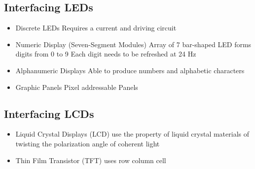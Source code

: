 \subsection{Interfacing LEDs}
\begin{itemize}
	\item Discrete \acs{LED}s
	\subitem Requires a current and driving circuit
	\item Numeric Display (Seven-Segment Modules)
	\subitem Array of 7 bar-shaped \acs{LED} forms digits from 0 to 9
	\subitem Each digit needs to be refreshed at 24 Hz
	\item Alphanumeric Displays
	\subitem Able to produce numbers and alphabetic characters
	\item Graphic Panels
	\subitem Pixel addressable Panels
\end{itemize}
\subsection{Interfacing \acs{LCD}s}
\begin{itemize}
	\item Liquid Crystal Displays (\acs{LCD}) use the property of liquid crystal materials of twisting the polarization angle of coherent light
	\item Thin Film Transistor (\acs{TFT}) uses row column cell
\end{itemize}
\clearpage